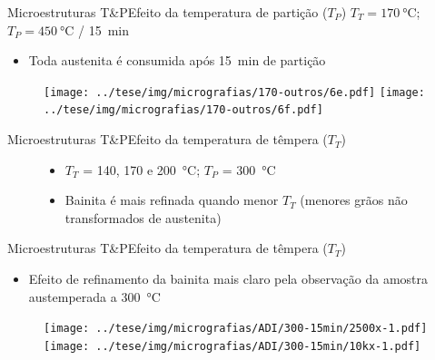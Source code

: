 \begin{frame}{Microestruturas T\&P}{Efeito da temperatura de partição ($T_P$)}
  $T_T = \SI{170}{\degreeCelsius}$; $T_P = \SI{450}{\degreeCelsius}$ / \SI{15}{min}

  \begin{itemize}
    \item Toda austenita é consumida após 15~min de partição
  \end{itemize}

  \begin{figure}
    \texttt{[image: ../tese/img/micrografias/170-outros/6e.pdf]}\hfill
    \texttt{[image: ../tese/img/micrografias/170-outros/6f.pdf]}
  \end{figure}
\end{frame}



\begin{frame}{Microestruturas T\&P}{Efeito da temperatura de têmpera ($T_T$)}
  \begin{figure}
    \begin{itemize}
      \item $T_T$ = 140, 170 e \SI{200}{\degreeCelsius}; $T_P$ = \SI{300}{\degreeCelsius}
      \item Bainita é mais refinada quando menor $T_T$ (menores grãos não transformados de austenita)
    \end{itemize}

  \end{figure}
\end{frame}

\begin{frame}{Microestruturas T\&P}{Efeito da temperatura de têmpera ($T_T$)}
  \begin{itemize}
    \item Efeito de refinamento da bainita mais claro pela observação da amostra austemperada a \SI{300}{\degreeCelsius}
  \end{itemize}

  \begin{figure}
    \texttt{[image: ../tese/img/micrografias/ADI/300-15min/2500x-1.pdf]}\hfill
    \texttt{[image: ../tese/img/micrografias/ADI/300-15min/10kx-1.pdf]}
  \end{figure}
\end{frame}

